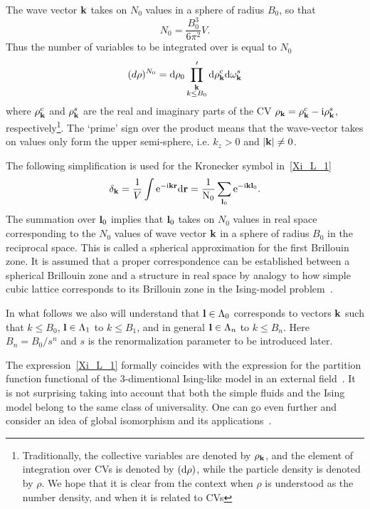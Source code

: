 The wave vector $\vb k$ takes on $N_0$ values in a sphere of radius $B_0$, so that
\begin{equation}
	\label{def:NB}
	N_0 = \frac{B_0^3}{6\pi^2}V.
\end{equation}
Thus the number of variables to be integrated over is equal to $N_0$
\begin{equation*}
	(d\rho)^{N_0} = {\rm d}\rho_0 \prod_{\substack{\vb k \\ k\le B_0}}' {\rm d}\rho_{\vb k}^c {\rm d}\omega_{\vb k}^s
\end{equation*}
where $\rho_{\vb k}^c$ and $\rho_{\vb k}^s$ are the real and imaginary parts of the CV $\rho_{\vb k} = \rho_{\vb k}^c - {\rm i} \rho_{\vb k}^s$, respectively\footnote{Traditionally, the collective variables are denoted by $\rho_{\vb k}$, and the element of integration over CVs is denoted by $({\rm d} \rho)$, while the particle density is denoted by $\rho$. We hope that it is clear from the context when $\rho$ is understood as the number density, and when it is related to CVs}. The `prime' sign over the product means that the wave-vector takes on values only form the upper semi-sphere, i.e. $k_z > 0$ and $\abs{\vb k} \neq 0$.

The following simplification is used for the Kronecker symbol in~\eqref{Xi_L_1}
\begin{equation*}
	\delta_{\vb k} = \frac{1}{V} \int \rm{e}^{-{\rm i} \vb k \vb r} \rm{d} \vb r = \frac{1}{N_0}\sum_{\vb l_0} {\rm e}^{-{\rm i} \vb k \vb l_0}.
\end{equation*}
The summation over $\vb l_0$ implies that $\vb l_0$ takes on $N_0$ values in real space corresponding to the $N_0$ values of wave vector $\vb k$ in a sphere of radius $B_0$ in the reciprocal space. This is called a spherical approximation for the first Brillouin zone. It is assumed that a proper correspondence can be established between a spherical Brillouin zone and a structure in real space by analogy to how simple cubic lattice corresponds to its Brillouin zone in the Ising-model problem~\cite{Yukh2001book}. 

In what follows we also will understand that $\vb l \in \Lambda_0$ corresponds to vectors $\vb k$ such that $k \leq B_0$, $\vb l \in \Lambda_1$ to $k \leq B_1$, and in general $\vb l \in \Lambda_n$ to $k \leq B_n$. Here $B_n = B_0/s^n$ and $s$ is the renormalization parameter to be introduced later.

The expression~\eqref{Xi_L_1} formally coincides with the expression for the partition function functional of the 3-dimentional Ising-like model in an external field~\cite{Mpk2012book,MpkRoma2012}. 
It is not surprising taking into account that both the simple fluids and the Ising model belong to the same class of universality. One can go even further and consider an idea of global isomorphism and its applications~\cite{Kulin2010,BulavKulin2010}.

